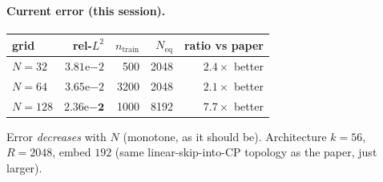 \paragraph{Current error (this session).}
\begin{center}
\begin{tabular}{l r r r r}
  \textbf{grid} & \textbf{rel-$L^2$} & $n_\mathrm{train}$ & $N_\mathrm{eq}$ & \textbf{ratio vs paper} \\
  \hline
  $N=32$  & $3.81\mathrm{e}{-2}$ & 500  & 2048 & $\mathbf{2.4\times}$ better \\
  $N=64$  & $3.65\mathrm{e}{-2}$ & 3200 & 2048 & $\mathbf{2.1\times}$ better \\
  $N=128$ & $\mathbf{2.36\mathrm{e}{-2}}$ & 1000 & 8192 & $\mathbf{7.7\times}$ better \\
\end{tabular}
\end{center}
Error \emph{decreases} with $N$ (monotone, as it should be). Architecture
$k{=}56$, $R{=}2048$, embed $192$ (same linear-skip-into-CP topology as
the paper, just larger).

